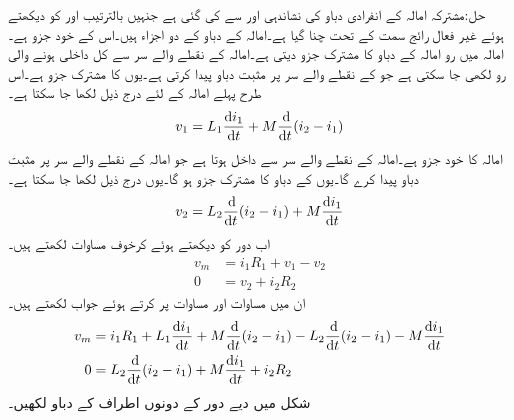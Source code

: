 حل:مشترکہ امالہ کے انفرادی دباو کی نشاندہی  اور  سے کی گئی ہے جنہیں بالترتیب  اور  کو دیکھتے ہوئے غیر فعال رائج سمت کے تحت چنا گیا ہے۔امالہ  کے دباو کے دو اجزاء ہیں۔اس کے خود جزو  ہے۔امالہ  میں رو امالہ  کے دباو کا مشترک جزو دیتی ہے۔امالہ  کے نقطے والے سر سے کل داخلی ہونے والی رو  لکھی جا سکتی ہے جو  کے نقطے والے سر پر مثبت دباو پیدا کرتی ہے۔یوں  کا مشترک جزو  ہے۔اس طرح پہلے امالہ کے لئے درج ذیل لکھا جا سکتا ہے۔
\begin{align}\label{مساوات_مقناطیسی_مثال_مشترک_الف}
v_1=L_1 \frac{\dif i_1}{\dif t}+M\frac{\dif}{\dif t}(i_2-i_1)
\end{align}
امالہ  کا خود جزو  ہے۔امالہ  کے نقطے والے سر سے  داخل ہوتا ہے جو امالہ  کے نقطے والے سر پر مثبت دباو پیدا کرے گا۔یوں  کے دباو کا مشترک جزو  ہو گا۔یوں درج ذیل لکھا جا سکتا ہے۔
\begin{align}\label{مساوات_مقناطیسی_مثال_مشترک_ب}
v_2=L_2 \frac{\dif}{\dif t}(i_2-i_1)+M\frac{\dif i_1}{\dif t}
\end{align}
اب دور کو دیکھتے ہوئے کرخوف مساوات لکھتے ہیں۔
\begin{align}\label{مساوات_مقناطیسی_مثال_مشترک_پ}
v_m&=i_1 R_1+v_1-v_2\\
0&=v_2+i_2 R_2
\end{align}
ان میں مساوات  اور مساوات   پر کرتے ہوئے جواب لکھتے ہیں۔
\begin{align}
v_m&=i_1 R_1+L_1 \frac{\dif i_1}{\dif t}+M\frac{\dif}{\dif t}(i_2-i_1)-L_2 \frac{\dif}{\dif t}(i_2-i_1)-M\frac{\dif i_1}{\dif t}\\
0&=L_2 \frac{\dif}{\dif t}(i_2-i_1)+M\frac{\dif i_1}{\dif t}+i_2 R_2
\end{align}
شکل  میں دیے دور کے  دونوں اطراف کے دباو لکھیں۔
